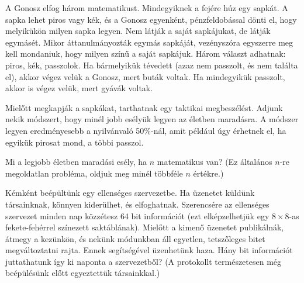 \begin{Exercise}[counter={sorszam}, difficulty=0]
	A Gonosz elfog három matematikust. Mindegyiknek a fejére húz egy sapkát. A sapka lehet piros vagy kék, és a Gonosz egyenként, pénzfeldobással dönti el, hogy melyikükön milyen sapka legyen. Nem látják a saját sapkájukat, de látják egymásét. Mikor áttanulmányozták egymás sapkáját, vezényszóra egyszerre meg kell mondaniuk, hogy milyen színű a saját sapkájuk. Három választ adhatnak: piros, kék, passzolok. Ha bármelyikük tévedett (azaz nem passzolt, és nem találta el), akkor végez velük a Gonosz, mert buták voltak. Ha mindegyikük passzolt, akkor is végez velük, mert gyávák voltak.
	
	Mielőtt megkapják a sapkákat, tarthatnak egy taktikai megbeszélést. Adjunk nekik módszert, hogy minél jobb esélyük legyen az életben maradásra. A módszer legyen eredményesebb a nyilvánvaló 50\%-nál, amit például úgy érhetnek el, ha egyikük pirosat mond, a többi passzol.
	
	Mi a legjobb életben maradási esély, ha $n$ matematikus van? (Ez általános $n$-re megoldatlan probléma, oldjuk meg minél többféle $n$ értékre.)
	
\end{Exercise}


\begin{Exercise}[counter={sorszam}, difficulty=0]
	Kémként beépültünk egy ellenséges szervezetbe. Ha üzenetet küldünk társainknak, könnyen kiderülhet, és elfoghatnak. Szerencsére az ellenséges szervezet minden nap közzétesz 64 bit információt (ezt elképzelhetjük egy $8 \times 8$-as fekete-fehérrel színezett saktáblának). Mielőtt a kimenő üzenetet publikálnák, átmegy a kezünkön, és nekünk módunkban áll egyetlen, tetszőleges bitet megváltoztatni rajta. Ennek segítségével üzenhetünk haza. Hány bit információt juttathatunk így ki naponta a szervezetből? (A protokollt természetesen még beépülésünk előtt egyeztettük társainkkal.)
\end{Exercise}



